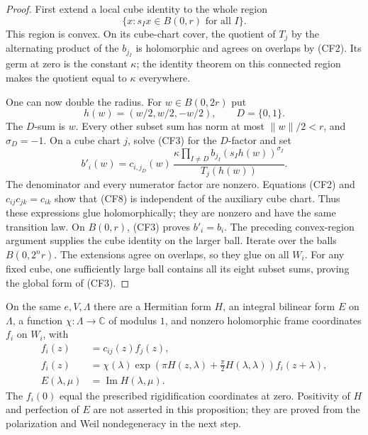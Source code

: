 \begin{proof}
First extend a local cube identity to the whole region
\[
                    \{x:s_Ix\in B(0,r)\text{ for all }I\}.
\]
This region is convex.  On its cube-chart cover, the quotient of
\(T_j\) by the alternating product of the \(b_{j_I}\) is holomorphic
and agrees on overlaps by (CF2).  Its germ at zero is the constant
\(\kappa\); the identity theorem on this connected region makes the
quotient equal to \(\kappa\) everywhere.

One can now double the radius.  For \(w\in B(0,2r)\) put
\[
                     h(w)=(w/2,w/2,-w/2),\qquad D=\{0,1\}.
\]
The \(D\)-sum is \(w\).  Every other subset sum has norm at most
\(\|w\|/2<r\), and \(\sigma_D=-1\).
On a cube chart \(j\), solve (CF3) for the \(D\)-factor and set
\[
 b'_i(w)=c_{i,j_D}(w)\,
      \frac{\kappa\prod_{I\ne D}
                   b_{j_I}(s_Ih(w))^{\sigma_I}}{T_j(h(w))}. \tag{CF8}
\]
The denominator and every numerator factor are nonzero.
Equations (CF2) and \(c_{ij}c_{jk}=c_{ik}\) show that (CF8) is
independent of the auxiliary cube chart.  Thus these expressions
glue holomorphically; they are nonzero and have the same transition
law.  On \(B(0,r)\), (CF3) proves \(b'_i=b_i\).
The preceding convex-region argument supplies the cube identity
on the larger ball.  Iterate over the balls \(B(0,2^nr)\).
The extensions agree on overlaps, so they glue on all \(W_i\).
For any fixed cube, one sufficiently large ball contains all its
eight subset sums, proving the global form of (CF3).
\end{proof}

\begin{srproposition}
\label{prop:ftb-actual-appell-humbert-frame}
On the same \(e,V,\Lambda\) there are a Hermitian form \(H\), an
integral bilinear form \(E\) on \(\Lambda\), a function
\(\chi:\Lambda\to\mathbb C\) of modulus \(1\), and nonzero holomorphic
frame coordinates \(f_i\) on \(W_i\), with
\[
 \begin{split}
 f_i(z)&=c_{ij}(z)f_j(z),\\
 f_i(z)&=\chi(\lambda)
       \exp\!\left(\pi H(z,\lambda)+\tfrac{\pi}{2}H(\lambda,\lambda)\right)
       f_i(z+\lambda),\\
 E(\lambda,\mu)&=\operatorname{Im}H(\lambda,\mu).
 \end{split}
 \tag{CF9}
\]
The \(f_i(0)\) equal the prescribed rigidification coordinates at
zero.  Positivity of \(H\) and perfection of \(E\) are not asserted in
this proposition; they are proved from the polarization and Weil
nondegeneracy in the next step.
\end{srproposition}


